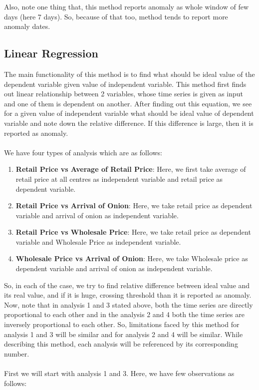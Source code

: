 \documentclass[a4paper,10pt]{report}
\begin{document}
	Also, note one thing that, this method reports anomaly as whole window of few days (here 7 days). So, because of that too, method tends to report more anomaly dates.


\subsection{Linear Regression}

		The main functionality of this method is to find what should be ideal value of the dependent variable given value of independent variable. This method first finds out linear relationship between 2 variables, whose time series is given as input and one of them is dependent on another. After finding out this equation, we see for a given value of independent variable what should be ideal value of dependent variable and note down the relative difference. If this difference is large, then it is reported as anomaly.\\
		\\
		We have four types of analysis which are as follows:
		\begin{enumerate}
			\item \textbf{Retail Price vs Average of Retail Price}: Here, we first take average of retail price at all centres as independent variable and retail price as dependent variable.			
			\item \textbf{Retail Price vs Arrival of Onion}: Here, we take retail price as dependent variable and arrival of onion as independent variable.
			\item \textbf{Retail Price vs Wholesale Price}: Here, we take retail price as dependent variable and Wholesale Price as independent variable.
			\item \textbf{Wholesale Price vs Arrival of Onion}: Here, we take Wholesale price as dependent variable and arrival of onion as independent variable.
		\end{enumerate}
		
		So, in each of the case, we try to find relative difference between ideal value and its real value, and if it is huge, crossing threshold than it is reported as anomaly. Now, note that in analysis 1 and 3 stated above, both the time series are directly proportional to each other and in the analysis 2 and 4 both the time series are inversely proportional to each other. So, limitations faced by this method for analysis 1 and 3 will be similar and for analysis 2 and 4 will be similar. While describing this method, each analysis will be referenced by its corresponding number.\\
		\\
		First we will start with analysis 1 and 3. Here, we have few observations as follows:
		
\end{document}
